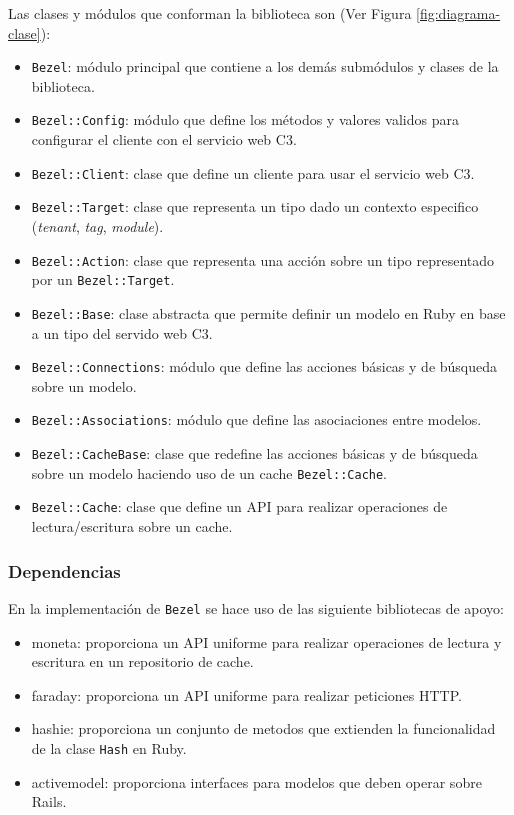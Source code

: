 Las clases y módulos que conforman la biblioteca son
(Ver Figura \ref{fig:diagrama-clase}):
\begin{itemize}
\item \texttt{Bezel}: módulo principal que contiene a los demás submódulos y
  clases de la biblioteca.
\item \texttt{Bezel::Config}: módulo que define los métodos y valores validos
  para configurar el cliente con el servicio web C3.
\item \texttt{Bezel::Client}: clase que define un cliente para usar el servicio
  web C3.
\item \texttt{Bezel::Target}: clase que representa un tipo dado un contexto
  especifico (\textit{tenant}, \textit{tag}, \textit{module}).
\item \texttt{Bezel::Action}: clase que representa una acción sobre
  un tipo representado por un \texttt{Bezel::Target}.
\item \texttt{Bezel::Base}: clase abstracta que permite definir un modelo en Ruby
  en base a un tipo del servido web C3.
\item \texttt{Bezel::Connections}: módulo que define las acciones básicas y de
  búsqueda sobre un modelo.
\item \texttt{Bezel::Associations}: módulo que define las asociaciones entre
  modelos.
\item \texttt{Bezel::CacheBase}: clase que redefine las acciones básicas y
  de búsqueda sobre un modelo haciendo uso de un cache \texttt{Bezel::Cache}.
\item \texttt{Bezel::Cache}: clase que define un API para realizar operaciones
  de lectura/escritura sobre un cache.
\end{itemize}


\subsubsection{Dependencias}

En la implementación de \texttt{Bezel} se hace uso de las siguiente bibliotecas
de apoyo:

\begin{itemize}
\item moneta: proporciona un API uniforme para realizar
  operaciones de lectura y escritura en un repositorio de cache.
\item faraday: proporciona un API uniforme para realizar
  peticiones HTTP.
\item hashie: proporciona un conjunto de metodos que extienden la funcionalidad
  de la clase \texttt{Hash} en Ruby.
\item activemodel: proporciona interfaces para modelos que deben operar sobre
  Rails.
\end{itemize}


